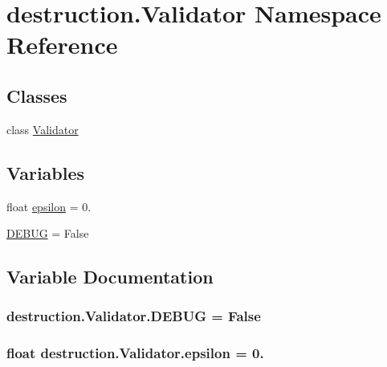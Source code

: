 \hypertarget{namespacedestruction_1_1_validator}{\section{destruction.\-Validator Namespace Reference}
\label{namespacedestruction_1_1_validator}
}
\subsection*{Classes}
\begin{DoxyCompactItemize}
\item 
class \hyperlink{classdestruction_1_1_validator_1_1_validator}{Validator}
\end{DoxyCompactItemize}
\subsection*{Variables}
\begin{DoxyCompactItemize}
\item 
float \hyperlink{namespacedestruction_1_1_validator_aae7249803f0804fa36e6f82e94d8e0c5}{epsilon} = 0.
\item 
\hyperlink{namespacedestruction_1_1_validator_ac9572e53ceabe3e4f5ca112b4f974b36}{D\-E\-B\-U\-G} = False
\end{DoxyCompactItemize}


\subsection{Variable Documentation}
\hypertarget{namespacedestruction_1_1_validator_ac9572e53ceabe3e4f5ca112b4f974b36}{
\subsubsection[{D\-E\-B\-U\-G}]{\setlength{\rightskip}{0pt plus 5cm}destruction.\-Validator.\-D\-E\-B\-U\-G = False}}\label{namespacedestruction_1_1_validator_ac9572e53ceabe3e4f5ca112b4f974b36}
\hypertarget{namespacedestruction_1_1_validator_aae7249803f0804fa36e6f82e94d8e0c5}{
\subsubsection[{epsilon}]{\setlength{\rightskip}{0pt plus 5cm}float destruction.\-Validator.\-epsilon = 0.}}\label{namespacedestruction_1_1_validator_aae7249803f0804fa36e6f82e94d8e0c5}
